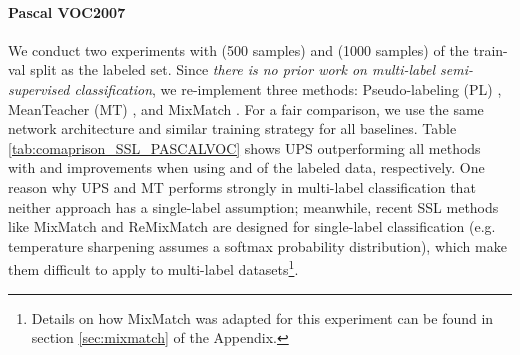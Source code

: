 \documentclass{article} \usepackage{iclr2021_conference,times}
\begin{document}
\paragraph{Pascal VOC2007} 
We conduct two experiments with  (500 samples) and  (1000 samples) of the train-val split as the labeled set. Since {\em there is no prior work on multi-label semi-supervised classification}, we re-implement three methods: Pseudo-labeling (PL) \citep{Lee2013PseudoLabelT},  MeanTeacher (MT) \citep{NIPS2017_6719_meanT}, and MixMatch \citep{NIPS2019_8749_MixMatch}. For a fair comparison, we use the same network architecture and similar training strategy for all baselines. Table \ref{tab:comaprison_SSL_PASCALVOC} shows UPS outperforming all methods with  and  improvements when using  and  of the labeled data, respectively. One reason why UPS and MT performs strongly in multi-label classification that neither approach has a single-label assumption; meanwhile, recent SSL methods like MixMatch and ReMixMatch are designed for single-label classification (e.g. temperature sharpening assumes a softmax probability distribution), which make them difficult to apply to multi-label datasets\footnote{Details on how MixMatch was adapted for this experiment can be found in section \ref{sec:mixmatch} of the Appendix.}. 
  
\end{document}

